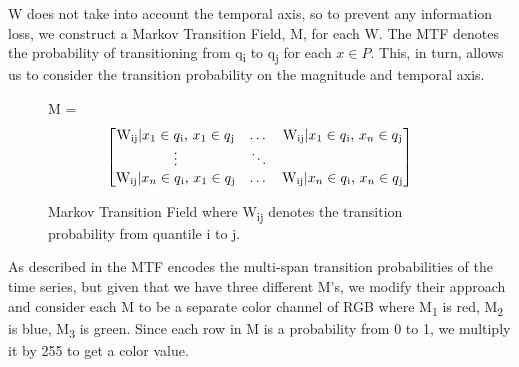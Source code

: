 \documentclass{turabian-thesis}[12pt]
\begin{document}

W does not take into account the temporal axis, so to prevent any information loss, we construct a Markov Transition Field, M, for each W. The MTF denotes the probability of transitioning from q\textsubscript{i} to q\textsubscript{j} for each $x \in P$. This, in turn, allows us to consider the transition probability on the magnitude and temporal axis.

\begin{figure}[h!]
  \centering
  M =
  \[\begin{bmatrix}

  \text{W\textsubscript{ij}} | \text{$x\textsubscript{1} \in q\textsubscript{i}$, $x_{1} \in q\textsubscript{j}$}
  & \dots &
  
  \text{W\textsubscript{ij}}  |  \text{$x_{1} \in q\textsubscript{i}$, $x_{n} \in q\textsubscript{j}$} 
  
  \\
  
  \vdots &  \ddots & \\
  
  \text{W\textsubscript{ij}} | \text{$x_{n} \in q\textsubscript{i}$, $x_{1} \in q\textsubscript{j}$}
  & \dots &
  \text{W\textsubscript{ij}} | \text{$x_{n} \in q\textsubscript{i}$, $x_{n} \in q\textsubscript{j}$} \\
  
  
  \end{bmatrix}\]
  \caption{Markov Transition Field where  W\textsubscript{ij} denotes the transition probability from quantile i to j.}
  \label{fig:mtf}
\end{figure}

As described in \cite{wang_encoding_nodate} the MTF encodes the multi-span transition probabilities of the time series, but given that we have three different M's, we modify their approach and consider each M to be a separate color channel of RGB where M\textsubscript{1} is red, M\textsubscript{2} is blue, M\textsubscript{3} is green. Since each row in M is a probability from 0 to 1, we multiply it by 255 to get a color value.
\end{document}
